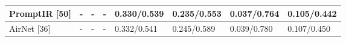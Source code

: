\begin{tabular}{llllllll}
\toprule
PromptIR [50] & - & - & - & 0.330/0.539 & 0.235/0.553 & 0.037/0.764 & 0.105/0.442 \\
\midrule
AirNet [36] & - & - & - & 0.332/0.541 & 0.245/0.589 & 0.039/0.780 & 0.107/0.450 \\
\bottomrule
\end{tabular}
